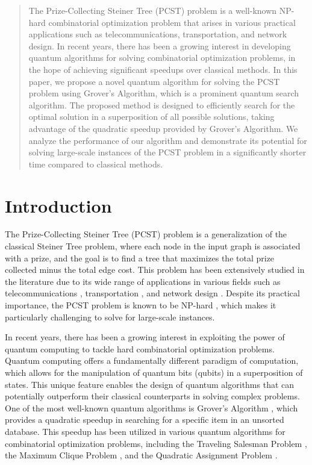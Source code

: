 \begin{abstract}
The Prize-Collecting Steiner Tree (PCST) problem is a well-known NP-hard combinatorial optimization problem that arises in various practical applications such as telecommunications, transportation, and network design. In recent years, there has been a growing interest in developing quantum algorithms for solving combinatorial optimization problems, in the hope of achieving significant speedups over classical methods. In this paper, we propose a novel quantum algorithm for solving the PCST problem using Grover's Algorithm, which is a prominent quantum search algorithm. The proposed method is designed to efficiently search for the optimal solution in a superposition of all possible solutions, taking advantage of the quadratic speedup provided by Grover's Algorithm. We analyze the performance of our algorithm and demonstrate its potential for solving large-scale instances of the PCST problem in a significantly shorter time compared to classical methods.
\end{abstract}

\section{Introduction}

The Prize-Collecting Steiner Tree (PCST) problem is a generalization of the classical Steiner Tree problem, where each node in the input graph is associated with a prize, and the goal is to find a tree that maximizes the total prize collected minus the total edge cost. This problem has been extensively studied in the literature due to its wide range of applications in various fields such as telecommunications \cite{ref1}, transportation \cite{ref2}, and network design \cite{ref3}. Despite its practical importance, the PCST problem is known to be NP-hard \cite{ref4}, which makes it particularly challenging to solve for large-scale instances.

In recent years, there has been a growing interest in exploiting the power of quantum computing to tackle hard combinatorial optimization problems. Quantum computing offers a fundamentally different paradigm of computation, which allows for the manipulation of quantum bits (qubits) in a superposition of states. This unique feature enables the design of quantum algorithms that can potentially outperform their classical counterparts in solving complex problems. One of the most well-known quantum algorithms is Grover's Algorithm \cite{grover1996}, which provides a quadratic speedup in searching for a specific item in an unsorted database. This speedup has been utilized in various quantum algorithms for combinatorial optimization problems, including the Traveling Salesman Problem \cite{ref5}, the Maximum Clique Problem \cite{ref6}, and the Quadratic Assignment Problem \cite{ref7}.

